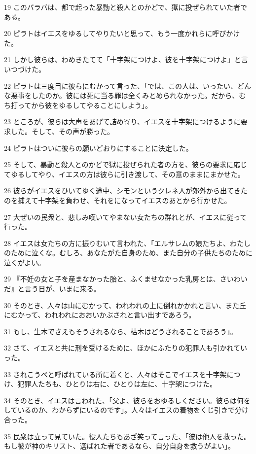\par 19 このバラバは、都で起った暴動と殺人とのかどで、獄に投ぜられていた者である。
\par 20 ピラトはイエスをゆるしてやりたいと思って、もう一度かれらに呼びかけた。
\par 21 しかし彼らは、わめきたてて「十字架につけよ、彼を十字架につけよ」と言いつづけた。
\par 22 ピラトは三度目に彼らにむかって言った、「では、この人は、いったい、どんな悪事をしたのか。彼には死に当る罪は全くみとめられなかった。だから、むち打ってから彼をゆるしてやることにしよう」。
\par 23 ところが、彼らは大声をあげて詰め寄り、イエスを十字架につけるように要求した。そして、その声が勝った。
\par 24 ピラトはついに彼らの願いどおりにすることに決定した。
\par 25 そして、暴動と殺人とのかどで獄に投ぜられた者の方を、彼らの要求に応じてゆるしてやり、イエスの方は彼らに引き渡して、その意のままにまかせた。
\par 26 彼らがイエスをひいてゆく途中、シモンというクレネ人が郊外から出てきたのを捕えて十字架を負わせ、それをになってイエスのあとから行かせた。
\par 27 大ぜいの民衆と、悲しみ嘆いてやまない女たちの群れとが、イエスに従って行った。
\par 28 イエスは女たちの方に振りむいて言われた、「エルサレムの娘たちよ、わたしのために泣くな。むしろ、あなたがた自身のため、また自分の子供たちのために泣くがよい。
\par 29 『不妊の女と子を産まなかった胎と、ふくませなかった乳房とは、さいわいだ』と言う日が、いまに来る。
\par 30 そのとき、人々は山にむかって、われわれの上に倒れかかれと言い、また丘にむかって、われわれにおおいかぶされと言い出すであろう。
\par 31 もし、生木でさえもそうされるなら、枯木はどうされることであろう」。
\par 32 さて、イエスと共に刑を受けるために、ほかにふたりの犯罪人も引かれていった。
\par 33 されこうべと呼ばれている所に着くと、人々はそこでイエスを十字架につけ、犯罪人たちも、ひとりは右に、ひとりは左に、十字架につけた。
\par 34 そのとき、イエスは言われた、「父よ、彼らをおゆるしください。彼らは何をしているのか、わからずにいるのです」。人々はイエスの着物をくじ引きで分け合った。
\par 35 民衆は立って見ていた。役人たちもあざ笑って言った、「彼は他人を救った。もし彼が神のキリスト、選ばれた者であるなら、自分自身を救うがよい」。
